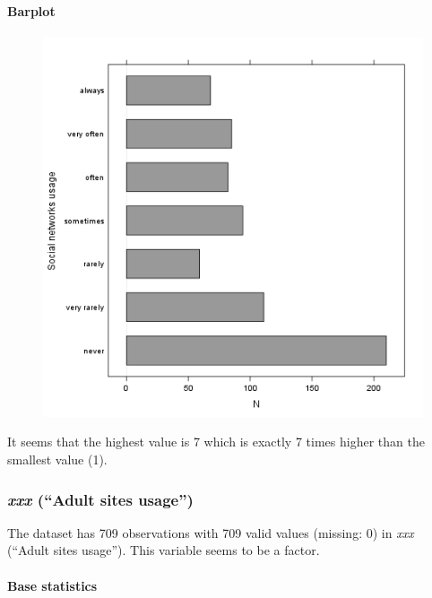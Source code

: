 \documentclass{article}
\makeatletter
\def\maxwidth{\ifdim\Gin@nat@width>\linewidth\linewidth
\else\Gin@nat@width\fi}
\let\Oldincludegraphics\includegraphics
\renewcommand{\includegraphics}[1]{\Oldincludegraphics[width=\maxwidth]{#1}}
\makeatother
\begin{document}
\paragraph{Barplot}

\begin{figure}[htbp]
\centering
\includegraphics{c1a552be1b3a4299ff06e272129d8096.png}
\caption{}
\end{figure}

It seems that the highest value is 7 which is exactly 7 times higher
than the smallest value (1).

\subsubsection{\emph{xxx} (``Adult sites usage'')}

The dataset has 709 observations with 709 valid values (missing: 0) in
\emph{xxx} (``Adult sites usage''). This variable seems to be a factor.

\paragraph{Base statistics}
\end{document}
